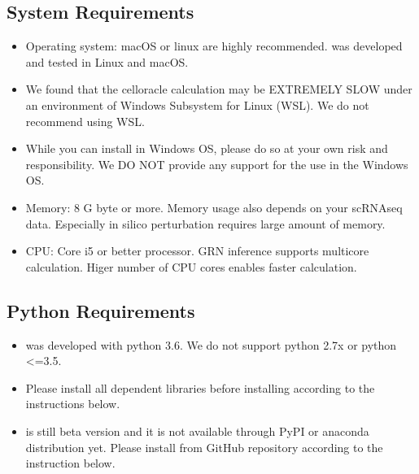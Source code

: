 \documentclass[letterpaper,10pt,english]{sphinxmanual}
\begin{document}
\subsection{System Requirements}
\label{\detokenize{installation/index:system-requirements}}\begin{itemize}
\item {} 
Operating system: macOS or linux are highly recommended.  was developed and tested in Linux and macOS.

\item {} 
We found that the celloracle calculation may be EXTREMELY SLOW under an environment of Windows Subsystem for Linux (WSL). We do not recommend using WSL.

\item {} 
While you can install  in Windows OS, please do so at your own risk and responsibility. We DO NOT provide any support for the use in the Windows OS.

\item {} 
Memory: 8 G byte or more.  Memory usage also depends on your scRNA\sphinxhyphen{}seq data. Especially in silico perturbation requires large amount of memory.

\item {} 
CPU: Core i5 or better processor. GRN inference supports multicore calculation. Higer number of CPU cores enables faster calculation.

\end{itemize}


\subsection{Python Requirements}
\label{\detokenize{installation/index:python-requirements}}\begin{itemize}
\item {} 
 was developed with python 3.6. We do not support python 2.7x or python \textless{}=3.5.

\item {} 
Please install all dependent libraries before installing  according to the instructions below.

\item {} 
  is still beta version and it is not available through PyPI or anaconda distribution yet. Please install  from GitHub repository according to the instruction below.

\end{itemize}
\end{document}
